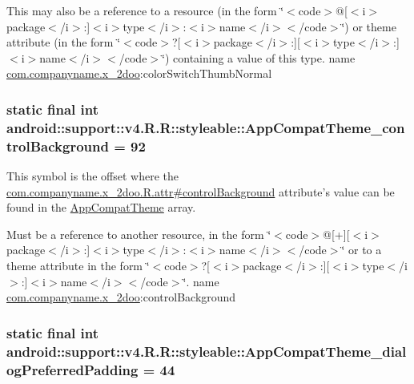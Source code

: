 This may also be a reference to a resource (in the form \char`\"{}$<$code$>$@\mbox{[}$<$i$>$package$<$/i$>$:\mbox{]}$<$i$>$type$<$/i$>$:$<$i$>$name$<$/i$>$$<$/code$>$\char`\"{}) or theme attribute (in the form \char`\"{}$<$code$>$?\mbox{[}$<$i$>$package$<$/i$>$:\mbox{]}\mbox{[}$<$i$>$type$<$/i$>$:\mbox{]}$<$i$>$name$<$/i$>$$<$/code$>$\char`\"{}) containing a value of this type.  name \hyperlink{namespacecom_1_1companyname_1_1x__2doo}{com.companyname.x\_\-2doo}:colorSwitchThumbNormal \hypertarget{classandroid_1_1support_1_1v4_1_1_r_1_1styleable_b1ed611d790b8dc74dd266f0047196a2}{
\subsubsection[{AppCompatTheme\_\-controlBackground}]{\setlength{\rightskip}{0pt plus 5cm}static final int android::support::v4.R.R::styleable::AppCompatTheme\_\-controlBackground = 92}}
\label{classandroid_1_1support_1_1v4_1_1_r_1_1styleable_b1ed611d790b8dc74dd266f0047196a2}


This symbol is the offset where the \hyperlink{classcom_1_1companyname_1_1x__2doo_1_1_r_1_1attr_8dcdd9a8cd023897d5588b69ab7a60f3}{com.companyname.x\_\-2doo.R.attr\#controlBackground} attribute's value can be found in the \hyperlink{classandroid_1_1support_1_1v4_1_1_r_1_1styleable_0873e92ba21076bb5a4aeadeb7f5779f}{AppCompatTheme} array.

Must be a reference to another resource, in the form \char`\"{}$<$code$>$@\mbox{[}+\mbox{]}\mbox{[}$<$i$>$package$<$/i$>$:\mbox{]}$<$i$>$type$<$/i$>$:$<$i$>$name$<$/i$>$$<$/code$>$\char`\"{} or to a theme attribute in the form \char`\"{}$<$code$>$?\mbox{[}$<$i$>$package$<$/i$>$:\mbox{]}\mbox{[}$<$i$>$type$<$/i$>$:\mbox{]}$<$i$>$name$<$/i$>$$<$/code$>$\char`\"{}.  name \hyperlink{namespacecom_1_1companyname_1_1x__2doo}{com.companyname.x\_\-2doo}:controlBackground \hypertarget{classandroid_1_1support_1_1v4_1_1_r_1_1styleable_6100ebfbe6b8c50952783dcdd55473e4}{
\subsubsection[{AppCompatTheme\_\-dialogPreferredPadding}]{\setlength{\rightskip}{0pt plus 5cm}static final int android::support::v4.R.R::styleable::AppCompatTheme\_\-dialogPreferredPadding = 44}}
\label{classandroid_1_1support_1_1v4_1_1_r_1_1styleable_6100ebfbe6b8c50952783dcdd55473e4}


